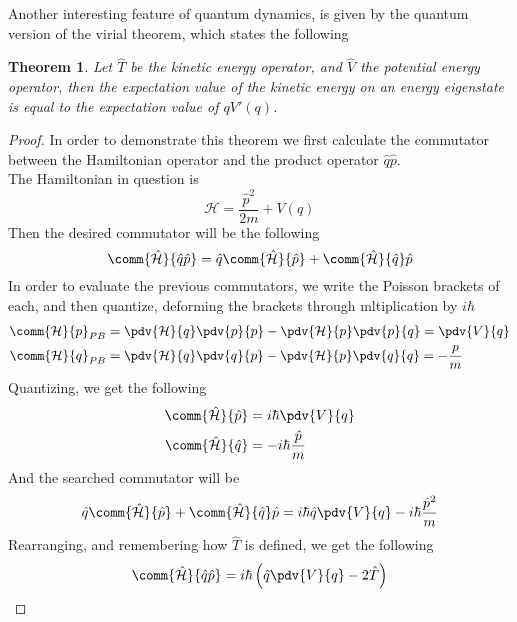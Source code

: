 \documentclass[a4paper, 11pt]{book}
\newcommand{\1}{\opr{\mathds{1}}}
\newcommand{\ham}{\mathcal{H}}
\newcommand{\opr}[1]{\hat{#1}}
\newcommand{\pcomm}[2]{\comm{#1}{#2}_{PB}}
\newtheorem{thm}{Theorem}
\theoremstyle{plain}
\begin{document}
	Another interesting feature of quantum dynamics, is given by the quantum version of the virial theorem, which states the following
	\begin{thm}
		Let $\opr{T}$ be the kinetic energy operator, and $\opr{V}$ the potential energy operator, then the expectation value of the kinetic energy on an energy eigenstate is equal to the expectation value of $qV'(q)$.
	\end{thm}
	\begin{proof}
		In order to demonstrate this theorem we first calculate the commutator between the Hamiltonian operator and the product operator $\opr{q}\opr{p}$.\\
		The Hamiltonian in question is
		\begin{equation*}
			\opr{\ham}=\frac{\opr{p}^2}{2m}+V(q)
		\end{equation*}
		Then the desired commutator will be the following
		\begin{equation*}
			\comm{\opr{\ham}}{\opr{q}\opr{p}}=\opr{q}\comm{\opr{\ham}}{\opr{p}}+\comm{\opr{\ham}}{\opr{q}}\opr{p}
		\end{equation*}
		In order to evaluate the previous commutators, we write the Poisson brackets of each, and then quantize, deforming the brackets through mltiplication by $i\hbar$
		\begin{equation*}
			\begin{aligned}
				\pcomm{\ham}{p}&=\pdv{\ham}{q}\pdv{p}{p}-\pdv{\ham}{p}\pdv{p}{q}=\pdv{V}{q}\\
				\pcomm{\ham}{q}&=\pdv{\ham}{q}\pdv{q}{p}-\pdv{\ham}{p}\pdv{q}{q}=-\frac{p}{m}
			\end{aligned}
		\end{equation*}
		Quantizing, we get the following
		\begin{equation*}
			\begin{aligned}
				\comm{\opr{\ham}}{\opr{p}}&=i\hbar\pdv{V}{q}\\
				\comm{\opr{\ham}}{\opr{q}}&=-i\hbar\frac{\opr{p}}{m}
			\end{aligned}
		\end{equation*}
		And the searched commutator will be
		\begin{equation*}
			\opr{q}\comm{\opr{\ham}}{\opr{p}}+\comm{\opr{\ham}}{\opr{q}}\opr{p}=i\hbar\opr{q}\pdv{V}{q}-i\hbar\frac{\opr{p}^2}{m}
		\end{equation*}
		Rearranging, and remembering how $\opr{T}$ is defined, we get the following
		\begin{equation*}
			\comm{\opr{\ham}}{\opr{q}\opr{p}}=i\hbar\left( \opr{q}\pdv{V}{q}-2\opr{T} \right)

\end{equation*}
\end{proof}
\end{document}
